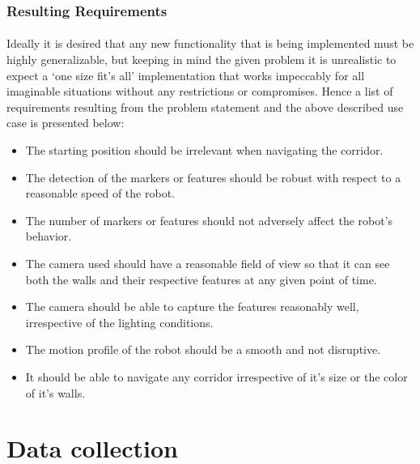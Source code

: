 \subsubsection*{Resulting Requirements}
\paragraph{} Ideally it is desired that any new functionality that is being implemented must be highly generalizable, but keeping in mind the given problem it is unrealistic to expect a `one size fit's all' implementation that works impeccably for all imaginable situations without any restrictions or compromises. Hence a list of requirements resulting from the problem statement and the above described use case is presented below:

\begin{itemize}
	\item The starting position should be irrelevant when navigating the corridor.
	
	\item The detection of the markers or features should be robust with respect to a reasonable speed of the robot.
	
	\item The number of markers or features should not adversely affect the robot's behavior. 
	
	\item The camera used should have a reasonable field of view so that it can see both the walls and their respective features at any given point of time.
	
	\item The camera should be able to capture the features reasonably well, irrespective of the lighting conditions.
	
	\item The motion profile of the robot should be a smooth and not disruptive. 
	
	\item It should be able to navigate any corridor irrespective of it's size or the color of it's walls.
\end{itemize}

\section{Data collection}
